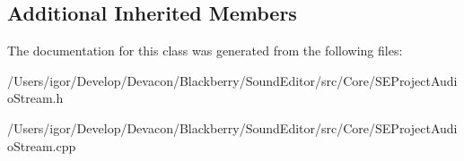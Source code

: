 \subsection*{Additional Inherited Members}


The documentation for this class was generated from the following files\+:\begin{DoxyCompactItemize}
\item 
/\+Users/igor/\+Develop/\+Devacon/\+Blackberry/\+Sound\+Editor/src/\+Core/S\+E\+Project\+Audio\+Stream.\+h\item 
/\+Users/igor/\+Develop/\+Devacon/\+Blackberry/\+Sound\+Editor/src/\+Core/S\+E\+Project\+Audio\+Stream.\+cpp\end{DoxyCompactItemize}

